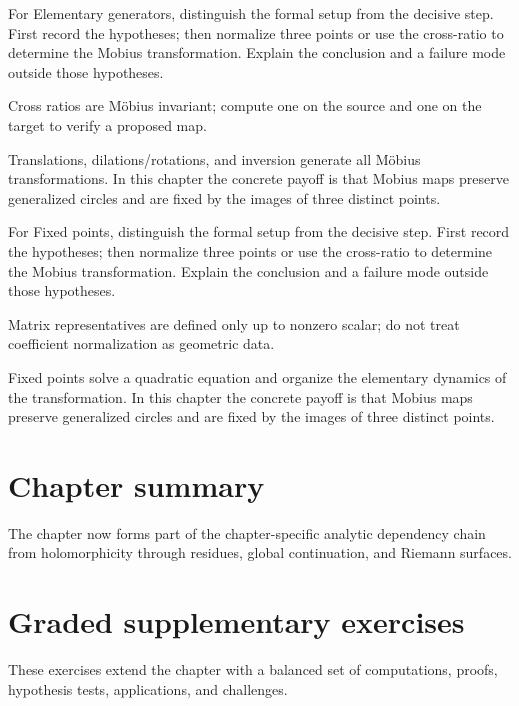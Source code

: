 \begin{exercise}\label{exr:iv16-07}
For Elementary generators, distinguish the formal setup from the decisive step. First record the hypotheses; then normalize three points or use the cross-ratio to determine the Mobius transformation. Explain the conclusion and a failure mode outside those hypotheses.
\end{exercise}
\begin{hint}
Cross ratios are Möbius invariant; compute one on the source and one on the target to verify a proposed map.
\end{hint}
\begin{solution}
Translations, dilations/rotations, and inversion generate all Möbius transformations. In this chapter the concrete payoff is that Mobius maps preserve generalized circles and are fixed by the images of three distinct points.
\end{solution}

\begin{exercise}\label{exr:iv16-08}
For Fixed points, distinguish the formal setup from the decisive step. First record the hypotheses; then normalize three points or use the cross-ratio to determine the Mobius transformation. Explain the conclusion and a failure mode outside those hypotheses.
\end{exercise}
\begin{hint}
Matrix representatives are defined only up to nonzero scalar; do not treat coefficient normalization as geometric data.
\end{hint}
\begin{solution}
Fixed points solve a quadratic equation and organize the elementary dynamics of the transformation. In this chapter the concrete payoff is that Mobius maps preserve generalized circles and are fixed by the images of three distinct points.
\end{solution}

\section*{Chapter summary}
The chapter now forms part of the chapter-specific analytic dependency chain from holomorphicity through residues, global continuation, and Riemann surfaces.
\section{Graded supplementary exercises}
These exercises extend the chapter with a balanced set of computations, proofs, hypothesis tests, applications, and challenges.

